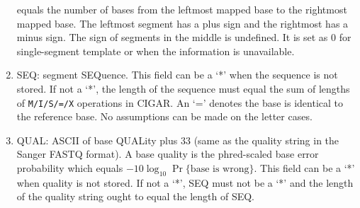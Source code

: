 \documentclass[10pt]{article}
\begin{document}
\begin{enumerate}
  equals the number of bases from the leftmost mapped base to the
  rightmost mapped base. The leftmost segment has a plus sign and the
  rightmost has a minus sign. The sign of segments in the middle is
  undefined. It is set as 0 for single-segment template or when the
  information is unavailable.
\item {\sf SEQ}: segment SEQuence. This field can be a `*' when the
  sequence is not stored. If not a `*', the length of the sequence must
  equal the sum of lengths of {\tt M/I/S/=/X} operations in {\sf CIGAR}.
  An `=' denotes the base is identical to the reference base. No
  assumptions can be made on the letter cases.
\item {\sf QUAL}: ASCII of base QUALity plus 33 (same as the quality
  string in the Sanger FASTQ format). A base quality is the phred-scaled
  base error probability which equals $-10\log_{10}\Pr\{\mbox{base is
    wrong}\}$. This field can be a `*' when quality is not stored. If
  not a `*', {\sf SEQ} must not be a `*' and the length of the quality string
  ought to equal the length of {\sf SEQ}.
\end{enumerate}
\end{document}

